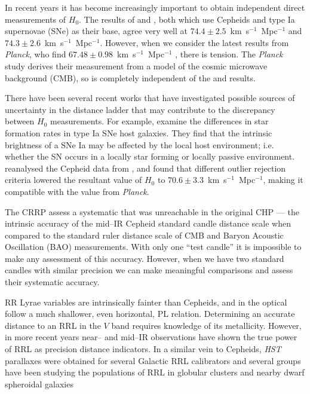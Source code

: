\documentclass[a4paper,fleqn,usenatbib]{mnras}
\newcommand{\ho}{$H_{0}$\xspace}
\begin{document}
In recent years it has become increasingly important to obtain independent direct measurements of \ho. The results of \citet{2011ApJ...730..119R} and \citet{2012ApJ...758...24F}, both which use Cepheids and type Ia supernovae (SNe) as their base, agree very well at $74.4\pm 2.5$~km~s$^{-1}$~Mpc$^{-1}$ and $74.3\pm2.6$~km~s$^{-1}$~Mpc$^{-1}$. However, when we consider the latest results from {\it Planck}, who find $67.48\pm0.98$~km~s$^{-1}$~Mpc$^{-1}$ \citep{2015arXiv150201589P}, there is tension. The {\it Planck} study derives their measurement from a model of the cosmic microwave background (CMB), so is completely independent of the \citeauthor{2011ApJ...730..119R} and \citeauthor{2012ApJ...758...24F} results. 

There have been several recent works that have investigated possible sources of uncertainty in the distance ladder that may contribute to the discrepancy between \ho measurements. For example, \citet{2015ApJ...802...20R} examine the differences in star formation rates in type Ia SNe host galaxies. They find that the intrinsic brightness of a SNe Ia may be affected by the local host environment; i.e. whether the SN occurs in a locally star forming or locally passive environment. \citet{2014MNRAS.440.1138E} reanalysed the Cepheid data from \citet{2011ApJ...730..119R}, and found that different outlier rejection criteria lowered the resultant value of \ho to $70.6 \pm 3.3$~km~s$^{-1}$~Mpc$^{-1}$, making it compatible with the value from {\it Planck}. 

The CRRP assess a systematic that was unreachable in the original CHP --- the intrinsic accuracy of the mid--IR Cepheid standard candle distance scale when compared to the standard ruler distance scale of CMB and Baryon Acoustic Oscillation (BAO) measurements. With only one ``test candle'' it is impossible to make any assessment of this accuracy. However, when we have two standard candles with similar precision we can make meaningful comparisons and assess their systematic accuracy.

RR Lyrae variables are intrinsically fainter than Cepheids, and in the optical follow a much shallower, even horizontal, PL relation. Determining an accurate distance to an RRL in the $V$ band requires knowledge of its metallicity. However, in more recent years near-- and mid--IR observations have shown the true power of RRL as precision distance indicators. In a similar vein to Cepheids, \textit{HST} parallaxes were obtained for several Galactic RRL calibrators \citep{2011AJ....142..187B} and several groups have been studying the populations of RRL in globular clusters and nearby dwarf spheroidal galaxies \citep[e.g.][and references therein]{2013ApJ...767...62G, 2014ApJ...786..147O, 2015ApJ...806..200C, 2015A&A...578A.128K}
\end{document}
